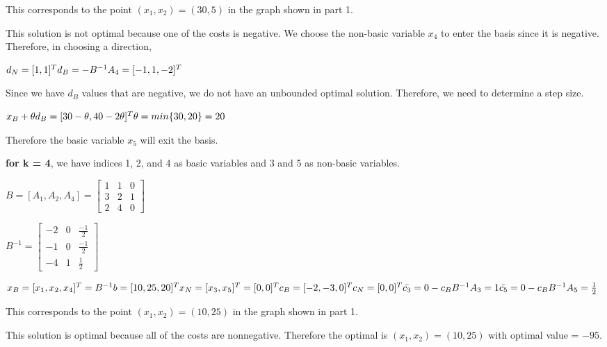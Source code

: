 \documentclass[11pt]{article}
\begin{document}
This corresponds to the point \((x_1, x_2) = (30, 5)\) in the graph
shown in part 1.

This solution is not optimal because one of the costs is negative. We
choose the non-basic variable \(x_4\) to enter the basis since it is
negative. Therefore, in choosing a direction,

\(d_N = [1, 1]^T \\ d_B = -B^{-1} A_4 = [-1, 1, -2]^T\)

Since we have \(d_B\) values that are negative, we do not have an
unbounded optimal solution. Therefore, we need to determine a step size.

\(x_B + \theta d_B = [30 - \theta, 40 - 2\theta]^T \\ \theta = min \{30, 20 \} = 20\)

Therefore the basic variable \(x_5\) will exit the basis.

    \textbf{for k = 4}, we have indices 1, 2, and 4 as basic variables and 3
and 5 as non-basic variables.

\(B = [A_1, A_2, A_4] = \begin{bmatrix} 1 & 1 & 0 \\ 3 & 2 & 1 \\ 2 & 4 & 0 \end{bmatrix}\)

\(B^{-1} = \begin{bmatrix} -2 & 0 & \frac{-1}{2} \\ -1 & 0 & \frac{-1}{2} \\ -4 & 1 & \frac{1}{2} \end{bmatrix}\)

\(x_B = [x_1, x_2, x_4]^T = B^{-1}b = [10, 25, 20]^ T \\ x_N = [x_3, x_5]^T = [0, 0]^T \\ c_B = [-2, -3, 0]^T \\ c_N = [0, 0]^T \\ \bar{c_3} = 0 - c_B B^{-1} A_3 = 1 \\ \bar{c_5} = 0 - c_B B^{-1} A_5 = \frac{1}{2}\)

This corresponds to the point \((x_1, x_2) = (10, 25)\) in the graph
shown in part 1.

This solution is optimal because all of the costs are nonnegative.
Therefore the optimal is \((x_1,x_2) = (10,25)\) with optimal value =
\(-95\).


    
    
    
    
\end{document}
